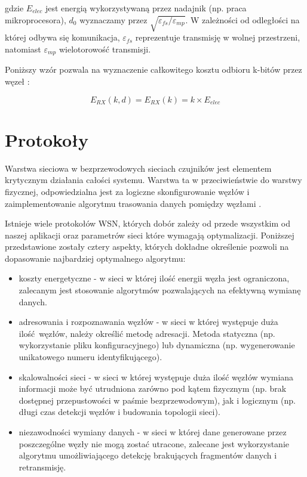 \documentclass[a4paper,12pt,twoside,openany]{report}
\begin{document}
gdzie $E_{elec}$ jest energią wykorzystywaną przez nadajnik (np. praca mikroprocesora), $d_{0}$ wyznaczamy przez $\sqrt{\varepsilon_{fs} / \varepsilon_{mp}}$.
W zależności od odległości na której odbywa się komunikacja, $\varepsilon_{fs}$ reprezentuje transmisję w wolnej przestrzeni, natomiast $\varepsilon_{mp}$
wielotorowość transmisji.

Poniższy wzór pozwala na wyznaczenie całkowitego kosztu odbioru k-bitów przez węzeł \cite{Heinzelman}:

\[E_{RX}(k,d) = E_{RX}(k) = k \times E_{elec}\]

\section{Protokoły}

Warstwa sieciowa w bezprzewodowych sieciach czujników jest elementem krytycznym działania całości systemu.
Warstwa ta w przeciwieństwie do warstwy fizycznej, odpowiedzialna jest za logiczne skonfigurowanie węzłów i
zaimplementowanie algorytmu trasowania danych pomiędzy węzłami \cite{Akyildiz} \cite{WSN-routing}.

Istnieje wiele protokołów WSN, których dobór zależy od przede wszystkim od naszej aplikacji oraz
parametrów sieci które wymagają optymalizacji. Poniższej przedstawione zostały cztery aspekty, których dokładne określenie pozwoli
na dopasowanie najbardziej optymalnego algorytmu:

\begin{itemize}
 \item koszty energetyczne - w sieci w której ilość energii węzła jest ograniczona, zalecanym jest stosowanie algorytmów pozwalających
       na efektywną wymianę danych.
 \item adresowania i rozpoznawania węzłów - w sieci w której występuje duża ilość węzłów, należy określić metodę adresacji.
       Metoda statyczna (np. wykorzystanie pliku konfiguracyjnego) lub dynamiczna (np. wygenerowanie unikatowego numeru identyfikującego).
 \item skalowalności sieci - w sieci w której występuje duża ilość węzłów wymiana informacji może być utrudniona zarówno pod kątem fizycznym
       (np. brak dostępnej przepustowości w paśmie bezprzewodowym), jak i logicznym (np. długi czas detekcji węzłów i budowania topologii sieci).
 \item niezawodności wymiany danych - w sieci w której dane generowane przez poszczególne węzły nie mogą zostać utracone, zalecane jest wykorzystanie
       algorytmu umożliwiającego detekcję brakujących fragmentów danych i retransmisję.
\end{itemize}
\end{document}
